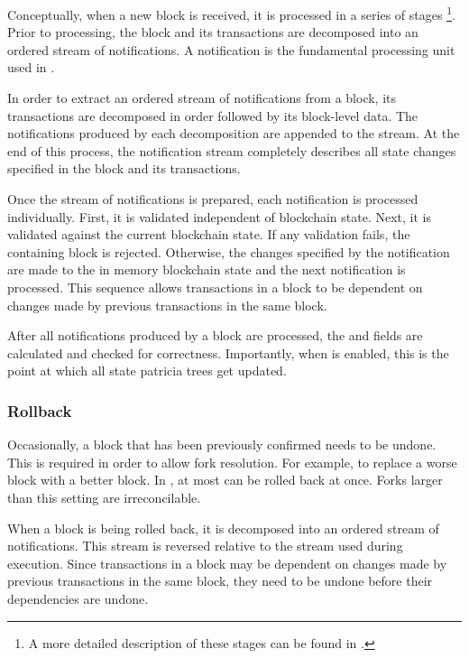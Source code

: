 Conceptually, when a new block is received, it is processed in a series of stages
\footnote{A more detailed description of these stages can be found in .}.
Prior to processing, the block and its transactions are decomposed into an ordered stream of notifications.
A notification is the fundamental processing unit used in \codename.

In order to extract an ordered stream of notifications from a block, its transactions are decomposed in order followed by its block-level data.
The notifications produced by each decomposition are appended to the stream.
At the end of this process, the notification stream completely describes all state changes specified in the block and its transactions.

Once the stream of notifications is prepared, each notification is processed individually.
First, it is validated independent of blockchain state.
Next, it is validated against the current blockchain state.
If any validation fails, the containing block is rejected.
Otherwise, the changes specified by the notification are made to the in memory blockchain state and the next notification is processed.
This sequence allows transactions in a block to be dependent on changes made by previous transactions in the same block.

After all notifications produced by a block are processed, the   and   fields are calculated and checked for correctness.
Importantly, when  is enabled, this is the point at which all state patricia trees get updated.

\subsubsection*{Rollback}

Occasionally, a block that has been previously confirmed needs to be undone.
This is required in order to allow fork resolution.
For example, to replace a worse block with a better block.
In \codename, at most  can be rolled back at once.
Forks larger than this setting are irreconcilable.

When a block is being rolled back, it is decomposed into an ordered stream of notifications.
This stream is reversed relative to the stream used during execution.
Since transactions in a block may be dependent on changes made by previous transactions in the same block, they need to be undone before their dependencies are undone.

